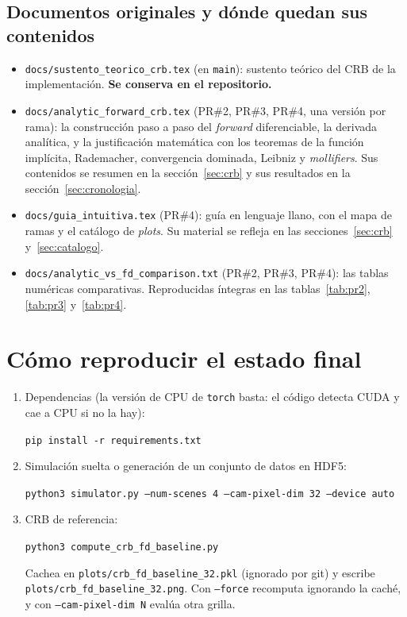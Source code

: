 \documentclass[11pt,a4paper]{article}
\newcommand{\code}[1]{\texttt{#1}}
\theoremstyle{definition}
\begin{document}
\subsection{Documentos originales y dónde quedan sus contenidos}

\begin{itemize}[leftmargin=*]
  \item \code{docs/sustento\_teorico\_crb.tex} (en \code{main}): sustento
        teórico del CRB de la implementación. \textbf{Se conserva en el
        repositorio.}
  \item \code{docs/analytic\_forward\_crb.tex} (PR\#2, PR\#3, PR\#4, una
        versión por rama): la construcción paso a paso del \emph{forward}
        diferenciable, la derivada analítica, y la justificación matemática con
        los teoremas de la función implícita, Rademacher, convergencia
        dominada, Leibniz y \emph{mollifiers}. Sus contenidos se resumen en la
        sección~\ref{sec:crb} y sus resultados en la
        sección~\ref{sec:cronologia}.
  \item \code{docs/guia\_intuitiva.tex} (PR\#4): guía en lenguaje llano, con el
        mapa de ramas y el catálogo de \emph{plots}. Su material se refleja en
        las secciones~\ref{sec:crb} y~\ref{sec:catalogo}.
  \item \code{docs/analytic\_vs\_fd\_comparison.txt} (PR\#2, PR\#3, PR\#4): las
        tablas numéricas comparativas. Reproducidas íntegras en las
        tablas~\ref{tab:pr2}, \ref{tab:pr3} y~\ref{tab:pr4}.
\end{itemize}

\section{Cómo reproducir el estado final}
\label{sec:reproducir}

\begin{enumerate}[leftmargin=*]
  \item Dependencias (la versión de CPU de \code{torch} basta: el código
        detecta CUDA y cae a CPU si no la hay):
        \begin{center}\code{pip install -r requirements.txt}\end{center}
  \item Simulación suelta o generación de un conjunto de datos en HDF5:
        \begin{center}
        \code{python3 simulator.py --num-scenes 4 --cam-pixel-dim 32 --device auto}
        \end{center}
  \item CRB de referencia:
        \begin{center}\code{python3 compute\_crb\_fd\_baseline.py}\end{center}
        Cachea en \code{plots/crb\_fd\_baseline\_32.pkl} (ignorado por git) y
        escribe \code{plots/crb\_fd\_baseline\_32.png}. Con \code{--force}
        recomputa ignorando la caché, y con \code{--cam-pixel-dim N} evalúa
        otra grilla.
\end{enumerate}
\end{document}
